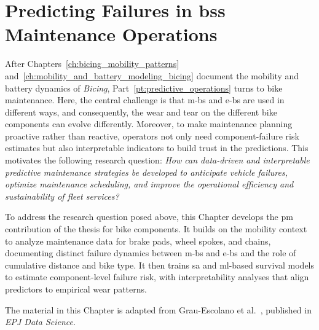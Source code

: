 \chapter[Predicting Failures in BSS Maintenance Operations]{Predicting Failures in \ac{bss} Maintenance Operations}
\label{ch:failure_forecasting_bicing}

After Chapters~\ref{ch:bicing_mobility_patterns} and~\ref{ch:mobility_and_battery_modeling_bicing} document the mobility and battery dynamics of \textit{Bicing}, Part~\ref{pt:predictive_operations} turns to bike maintenance. Here, the central challenge is that \acp{m-b} and \acp{e-b} are used in different ways, and consequently, the wear and tear on the different bike components can evolve differently. Moreover, to make maintenance planning proactive rather than reactive, operators not only need component-failure risk estimates but also interpretable indicators to build trust in the predictions. This motivates the following research question: \emph{How can data-driven and interpretable predictive maintenance strategies be developed to anticipate vehicle failures, optimize maintenance scheduling, and improve the operational efficiency and sustainability of fleet services?}

To address the research question posed above, this Chapter develops the \ac{pm} contribution of the thesis for bike components. It builds on the mobility context to analyze maintenance data for brake pads, wheel spokes, and chains, documenting distinct failure dynamics between \acp{m-b} and \acp{e-b} and the role of cumulative distance and bike type. It then trains \ac{sa} and \ac{ml}-based survival models to estimate component-level failure risk, with interpretability analyses that align predictors to empirical wear patterns.

The material in this Chapter is adapted from Grau-Escolano et al.~\cite{Grau-Escolano2024}, published in \textit{EPJ Data Science}.





